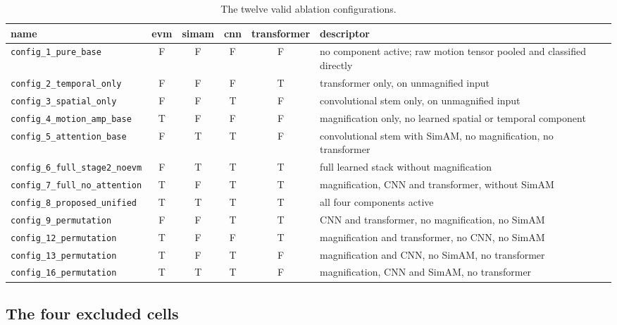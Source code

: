 \begin{table}[htbp]
	\centering
	\footnotesize
	\begin{tabular}{p{3.3cm} c c c c p{5.0cm}}
		\hline
		\textbf{name} & \textbf{evm} & \textbf{simam} & \textbf{cnn} & \textbf{transformer} & \textbf{descriptor} \\
		\hline
		\texttt{config\_1\_pure\_base}        & F & F & F & F & no component active; raw motion tensor pooled and classified directly \\
		\texttt{config\_2\_temporal\_only}    & F & F & F & T & transformer only, on unmagnified input \\
		\texttt{config\_3\_spatial\_only}     & F & F & T & F & convolutional stem only, on unmagnified input \\
		\texttt{config\_4\_motion\_amp\_base} & T & F & F & F & magnification only, no learned spatial or temporal component \\
		\texttt{config\_5\_attention\_base}   & F & T & T & F & convolutional stem with SimAM, no magnification, no transformer \\
		\texttt{config\_6\_full\_stage2\_noevm} & F & T & T & T & full learned stack without magnification \\
		\texttt{config\_7\_full\_no\_attention} & T & F & T & T & magnification, CNN and transformer, without SimAM \\
		\texttt{config\_8\_proposed\_unified} & T & T & T & T & all four components active \\
		\texttt{config\_9\_permutation}       & F & F & T & T & CNN and transformer, no magnification, no SimAM \\
		\texttt{config\_12\_permutation}      & T & F & F & T & magnification and transformer, no CNN, no SimAM \\
		\texttt{config\_13\_permutation}      & T & F & T & F & magnification and CNN, no SimAM, no transformer \\
		\texttt{config\_16\_permutation}      & T & T & T & F & magnification, CNN and SimAM, no transformer \\
		\hline
	\end{tabular}
	\caption[The twelve valid ablation configurations]{The twelve valid ablation configurations.}
	\label{tab:twelve-configs}
\end{table}

\subsection{The four excluded cells}
\label{sec:excluded-cells}

